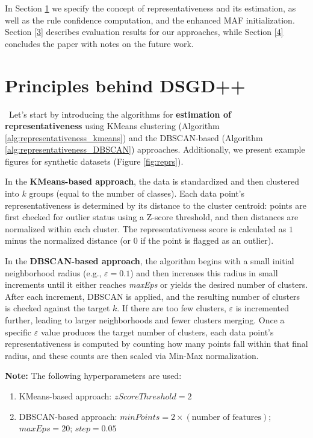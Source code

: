 \documentclass[10pt,a4paper,oneside]{article}
\begin{document}
{\color{blue}In Section \ref{2} we specify the concept of representativeness and its estimation, as well as the rule confidence computation, and the enhanced MAF initialization. Section \ref{3} describes evaluation results for our approaches, while Section \ref{4} concludes the paper with notes on the future work.}
\section{Principles behind DSGD++}\label{2}
\
{\color{blue}Let's start by introducing} the algorithms for \textbf{estimation of representativeness} using KMeans clustering (Algorithm \ref{alg:representativeness_kmeans}) and the DBSCAN-based (Algorithm \ref{alg:representativeness_DBSCAN}) approaches. Additionally, we present example figures for synthetic datasets (Figure \ref{fig:reprs}).

In the \textbf{KMeans-based approach}, the data is standardized and then clustered into \(k\) groups (equal to the number of classes). Each data point’s representativeness is determined by its distance to the cluster centroid: points are first checked for outlier status using a Z-score threshold, and then distances are normalized within each cluster. The representativeness score is calculated as \(1\) minus the normalized distance (or \(0\) if the point is flagged as an outlier).

In the \textbf{DBSCAN-based approach}, the algorithm begins with a small initial neighborhood radius (e.g., \(\varepsilon = 0.1\)) and then increases this radius in small increments until it either reaches \textit{maxEps} or yields the desired number of clusters. After each increment, DBSCAN is applied, and the resulting number of clusters is checked against the target \(k\). If there are too few clusters, \(\varepsilon\) is incremented further, leading to larger neighborhoods and fewer clusters merging. Once a specific \(\varepsilon\) value produces the target number of clusters, each data point’s representativeness is computed by counting how many points fall within that final radius, and these counts are then scaled via Min-Max normalization.

\textbf{Note:} The following hyperparameters are used:
\begin{enumerate}
    \item KMeans-based approach: $zScoreThreshold = 2$
    \item DBSCAN-based approach: $minPoints = 2 \times (\text{number of features})$; $maxEps = 20$; $step = 0.05$ 
\end{enumerate}
\end{document}
